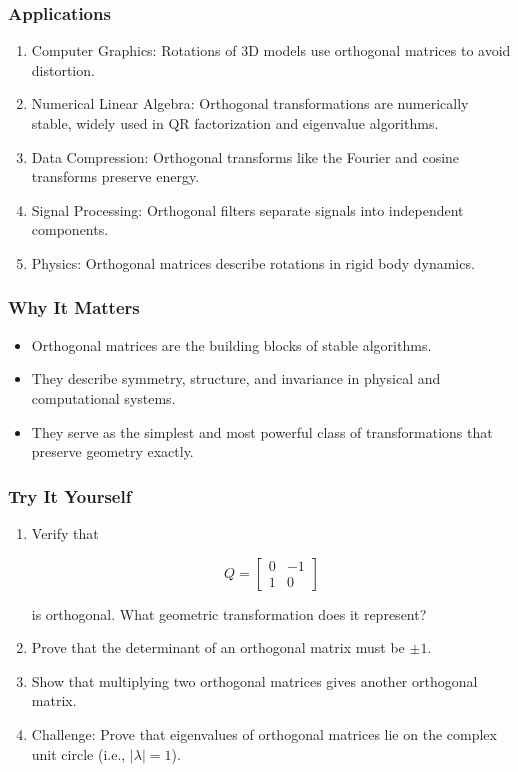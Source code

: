 \documentclass[
  letterpaper,
  DIV=11,
  numbers=noendperiod]{scrreprt}
\providecommand{\tightlist}{%
  \setlength{\itemsep}{0pt}\setlength{\parskip}{0pt}}
\begin{document}
\subsubsection{Applications}\label{applications-40}

\begin{enumerate}
\def\labelenumi{\arabic{enumi}.}
\tightlist
\item
  Computer Graphics: Rotations of 3D models use orthogonal matrices to
  avoid distortion.
\item
  Numerical Linear Algebra: Orthogonal transformations are numerically
  stable, widely used in QR factorization and eigenvalue algorithms.
\item
  Data Compression: Orthogonal transforms like the Fourier and cosine
  transforms preserve energy.
\item
  Signal Processing: Orthogonal filters separate signals into
  independent components.
\item
  Physics: Orthogonal matrices describe rotations in rigid body
  dynamics.
\end{enumerate}

\subsubsection{Why It Matters}\label{why-it-matters-74}

\begin{itemize}
\tightlist
\item
  Orthogonal matrices are the building blocks of stable algorithms.
\item
  They describe symmetry, structure, and invariance in physical and
  computational systems.
\item
  They serve as the simplest and most powerful class of transformations
  that preserve geometry exactly.
\end{itemize}

\subsubsection{Try It Yourself}\label{try-it-yourself-77}

\begin{enumerate}
\def\labelenumi{\arabic{enumi}.}
\item
  Verify that

  \[
  Q = \begin{bmatrix}0 & -1 \\ 1 & 0\end{bmatrix}
  \]

  is orthogonal. What geometric transformation does it represent?
\item
  Prove that the determinant of an orthogonal matrix must be \(\pm 1\).
\item
  Show that multiplying two orthogonal matrices gives another orthogonal
  matrix.
\item
  Challenge: Prove that eigenvalues of orthogonal matrices lie on the
  complex unit circle (i.e., \(|\lambda|=1\)).
\end{enumerate}
\end{document}
